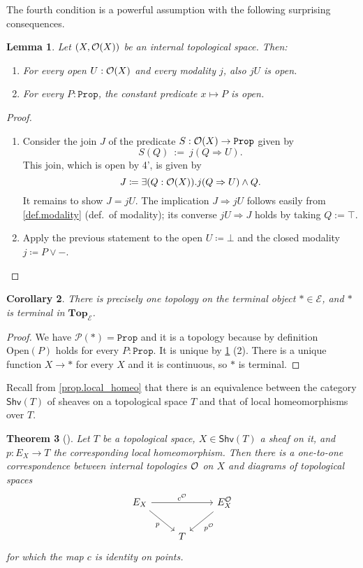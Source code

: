\documentclass[11pt, oneside, article]{memoir}
\theoremstyle{plain}
\newtheorem{theorem}{Theorem}[chapter] %
\newtheorem{corollary}[theorem]{Corollary}
\newtheorem{lemma}[theorem]{Lemma}
\theoremstyle{definition}
\theoremstyle{remark}
\newcommand{\const}[1]{\mathtt{#1}}
\newcommand{\Set}[1]{\mathrm{#1}}
\newcommand{\cat}[1]{\mathcal{#1}}
\newcommand{\Cat}[1]{\mathbf{#1}}
\newcommand{\Fun}[1]{\mathsf{#1}}
\newcommand{\pow}{\mathcal{P}}
\newcommand{\shv}{\Fun{Shv}}
\newcommand{\prop}{\const{Prop}}
\renewcommand{\Top}{\Cat{Top}}
\newcommand{\Op}[1][undef]{\ifthenelse{\equal{#1}{undef}}{\mathcal{O}}{\mathcal{O}(#1)}}
\newcommand{\Open}{\Set{Open}}
\newcommand{\imp}{\Rightarrow}
\begin{document}
The fourth condition is a powerful assumption with the following surprising consequences.

\begin{lemma}
	\label{props_open}
	Let $(X,\Op[X])$ be an internal topological space. Then:
	\begin{enumerate}
		\item For every open $U : \Op[X]$ and every modality $j$, also $jU$ is open.
		\item For every $P : \prop$, the constant predicate $x \mapsto P$ is open.
	\end{enumerate}
\end{lemma}

\begin{proof}
	\begin{enumerate}
		\item Consider the join $J$ of the predicate $S : \Op[X] \to \prop$ given by
			\[
				S(Q) \: := \: j(Q \Rightarrow U).
			\]
			This join, which is open by 4', is given by
			\[
				J\coloneqq\exists(Q : \Op[X]) . j(Q \Rightarrow U) \land Q.
			\]
			It remains to show $J=jU$. The implication $J\imp jU$ follows easily from \cref{def.modality} (def.\ of modality); its converse $jU\imp J$ holds by taking $Q := \top$.
		\item Apply the previous statement to the open $U\coloneqq\bot$ and the closed modality $j\coloneqq P \lor -$. \qedhere
	\end{enumerate}
\end{proof}

\begin{corollary}\label{cor.top_on_one}
There is precisely one topology on the terminal object $*\in\cat{E}$, and $*$ is terminal in $\Top_\cat{E}$.
\end{corollary}
\begin{proof}
We have $\pow(*)=\prop$ and it is a topology because by definition $\Open(P)$ holds for every $P:\prop$. It is unique by \cref{props_open} (2). There is a unique function $X\to *$ for every $X$ and it is continuous, so $*$ is terminal.
\end{proof}

Recall from \cref{prop.local_homeo} that there is an equivalence between the category $\shv(T)$ of sheaves on a topological space $T$ and that of local homeomorphisms over $T$.

\begin{theorem}[{\cite[Theorem 1.5]{moerdijk1984spaced}}]
\label{moerdijks_theorem}
Let $T$ be a topological space, $X\in\shv(T)$ a sheaf on it, and $p\colon E_X\to T$ the corresponding local homeomorphism. Then there is a one-to-one correspondence between internal topologies $\Op$ on $X$ and diagrams of topological spaces
\[
\begin{tikzcd}
	E_X\ar[dr, "p"']\ar[rr, "c^{\Op}"]&&
	E_X^{\Op}\ar[dl, "p^{\Op}"]\\&
	T
\end{tikzcd}
\]
for which the map $c$ is identity on points.
\end{theorem}
\end{document}
